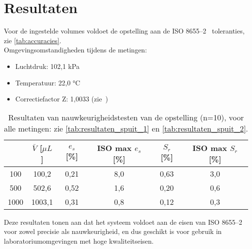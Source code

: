 \chapter{Resultaten}
Voor de ingestelde volumes voldoet de opstelling aan de ISO 8655--2\ \cite{RN51} toleranties, zie \autoref{tab:accuracies}.
\\[12pt]Omgevingsomstandigheden tijdens de metingen:
\begin{itemize}
    \item Luchtdruk: 102,1 kPa
    \item Temperatuur: 22,0 °C
    \item Correctiefactor Z: 1,0033 (zie\ \cite{RN50})
\end{itemize}
\begin{table}[H] 
    \centering 
    \caption{Resultaten van nauwkeurigheidstesten van de opstelling (n=10), voor alle metingen: zie \autoref{tab:resultaten_spuit_1} en \autoref{tab:resultaten_spuit_2}.}
    \begin{tabular}{|c|c|c|c|c|c|}
        \hline
        \textbf{\rule{0pt}{3ex}$V_{wens}$ [$\mu L$]} & 
        \textbf{$\bar{V}$ [$\mu L$]} & 
        \textbf{$e_s$ [\%]} & 
        \textbf{ISO max $e_s$ [\%]} &
        \textbf{$S_r$ [\%]} &
        \textbf{ISO max $S_r$ [\%]} \\
        \hline
        100  & 100,2 & 0,21 & 8,0  & 0,63 & 3,0 \\
        500  & 502,6 & 0,52  & 1,6  & 0,20 & 0,6 \\
        1000 & 1003,1  & 0,31  & 0,8  & 0,12 & 0,3 \\
        \hline
    \end{tabular}\label{tab:accuracies}
\end{table}


Deze resultaten tonen aan dat het systeem voldoet aan de eisen van ISO 8655--2 voor zowel precisie als nauwkeurigheid, en dus geschikt is voor gebruik in laboratoriumomgevingen met hoge kwaliteitseisen.